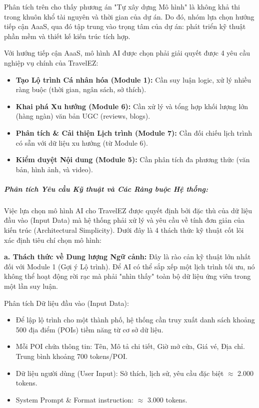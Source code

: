 Phân tích trên cho thấy phương án "Tự xây dựng Mô hình" là không khả thi trong khuôn khổ tài nguyên và thời gian của dự án. Do đó, nhóm lựa chọn hướng tiếp cận AaaS, qua đó tập trung vào trọng tâm của dự án: phát triển kỹ thuật phần mềm và thiết kế kiến trúc tích hợp.

Với hướng tiếp cận AaaS, mô hình AI được chọn phải giải quyết được 4 yêu cầu nghiệp vụ chính của TravelEZ:

\begin{itemize}
    \item \textbf{Tạo Lộ trình Cá nhân hóa (Module 1):} Cần suy luận logic, xử lý nhiều ràng buộc (thời gian, ngân sách, sở thích).
    \item \textbf{Khai phá Xu hướng (Module 6):} Cần xử lý và tổng hợp khối lượng lớn (hàng ngàn) văn bản UGC (reviews, blogs).
    \item \textbf{Phân tích \& Cải thiện Lịch trình (Module 7):} Cần đối chiếu lịch trình có sẵn với dữ liệu xu hướng (từ Module 6).
    \item \textbf{Kiểm duyệt Nội dung (Module 5):} Cần phân tích đa phương thức (văn bản, hình ảnh, và video).
\end{itemize}

\subparagraph{Phân tích Yêu cầu Kỹ thuật và Các Ràng buộc Hệ thống:}

Việc lựa chọn mô hình AI cho TravelEZ được quyết định bởi đặc thù của dữ liệu đầu vào (Input Data) mà hệ thống phải xử lý và yêu cầu về tính đơn giản của kiến trúc (Architectural Simplicity). Dưới đây là 4 thách thức kỹ thuật cốt lõi xác định tiêu chí chọn mô hình:

\textbf{a. Thách thức về Dung lượng Ngữ cảnh:} Đây là rào cản kỹ thuật lớn nhất đối với Module 1 (Gợi ý Lộ trình). Để AI có thể sắp xếp một lịch trình tối ưu, nó không thể hoạt động rời rạc mà phải "nhìn thấy" toàn bộ dữ liệu ứng viên trong một lần suy luận.

Phân tích Dữ liệu đầu vào (Input Data):
\begin{itemize}
    \item Để lập lộ trình cho một thành phố, hệ thống cần truy xuất danh sách khoảng 500 địa điểm (POIs) tiềm năng từ cơ sở dữ liệu.
    \item Mỗi POI chứa thông tin: Tên, Mô tả chi tiết, Giờ mở cửa, Giá vé, Địa chỉ. Trung bình khoảng 700 tokens/POI.
    \item Dữ liệu người dùng (User Input): Sở thích, lịch sử, yêu cầu đặc biệt $\approx$ 2.000 tokens.
    \item System Prompt \& Format instruction: $\approx$ 3.000 tokens.
\end{itemize}


